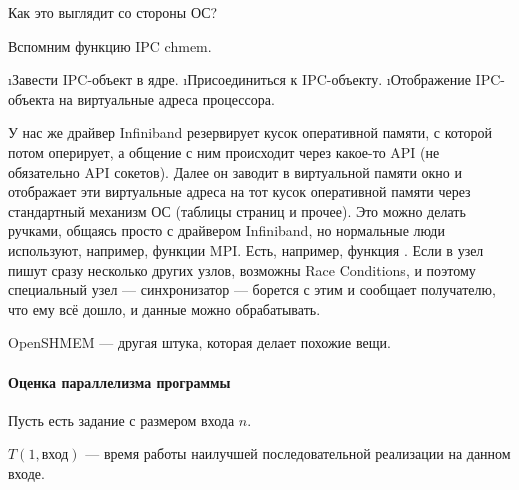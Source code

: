 Как это выглядит со стороны ОС?

Вспомним функцию IPC chmem.
\begin{enumerate}
\i Завести IPC-объект в ядре.
\i Присоединиться к IPC-объекту.
\i Отображение IPC-объекта на виртуальные адреса процессора.
\end{enumerate}

У нас же драйвер Infiniband резервирует кусок оперативной памяти, с которой потом оперирует, а общение с ним происходит через какое-то API (не обязательно API сокетов). Далее он заводит в виртуальной памяти окно и отображает эти виртуальные адреса на тот кусок оперативной памяти через стандартный механизм ОС (таблицы страниц и прочее). Это можно делать ручками, общаясь просто с драйвером Infiniband, но нормальные люди используют, например, функции MPI. Есть, например, функция . Если в узел пишут сразу несколько других узлов, возможны Race Conditions, и поэтому специальный узел --- синхронизатор --- борется с этим и сообщает получателю, что ему всё дошло, и данные можно обрабатывать.

OpenSHMEM --- другая штука, которая делает похожие вещи.

\paragraph{Оценка параллелизма программы}

Пусть есть задание с размером входа $n$.

$T(1, \text{вход})$ --- время работы наилучшей последовательной реализации на данном входе.

